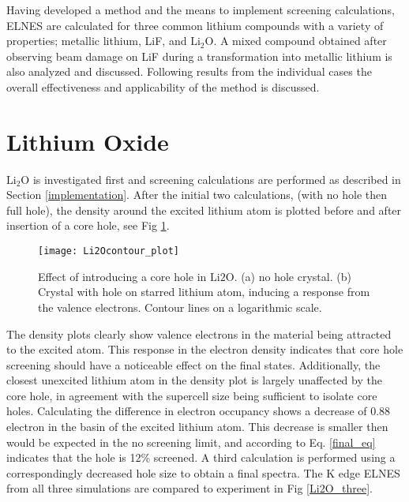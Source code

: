 
Having developed a method and the means to implement screening calculations, ELNES are calculated for three common lithium compounds with a variety of properties; metallic lithium, LiF, and  $\mathrm{Li_2O}$.  A mixed compound obtained after observing beam damage on LiF during a transformation into metallic lithium is also analyzed and discussed.  Following results from the individual cases the overall effectiveness and applicability of the method is discussed.




\section{Lithium Oxide}

 $ \mathrm{Li_2O} $ is investigated first and screening calculations are performed as described in Section \ref{implementation}.   After the initial two calculations, (with no hole then full hole), the density around the excited lithium atom is plotted before and after insertion of a core hole, see Fig \ref{Li2O_contour}.  \\

\begin{figure}
	\centering
	\texttt{[image: Li2Ocontour\_plot]}
	\caption{Effect of introducing a core hole in $ \mathrm{Li2O} $.  (a) no hole crystal.  (b) Crystal with hole on starred lithium atom, inducing a response from the valence electrons.  Contour lines on a logarithmic scale. }
	\label{Li2O_contour}
\end{figure}

The density plots clearly show valence electrons in the material being attracted to the excited atom. This response in the electron density indicates that core hole screening should have a noticeable effect on the final states.  Additionally, the closest unexcited lithium atom in the density plot is largely unaffected by the core hole, in agreement with the supercell size being sufficient to isolate core holes.  Calculating the difference in electron occupancy shows a decrease of 0.88 electron in the basin of the excited lithium atom.  This decrease is smaller then would be expected in the no screening limit, and according to Eq. \ref{final_eq} indicates that the hole is 12\% screened.  A third calculation is performed using a correspondingly decreased hole size to obtain a final spectra.  The K edge ELNES from all three simulations are compared to experiment in Fig \ref{Li2O_three}.  \\

